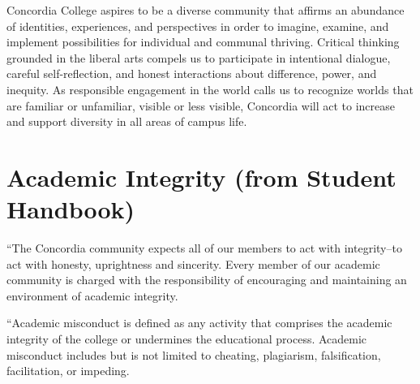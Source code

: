 \documentclass{tufte-handout}
\begin{document}
\begin{fullwidth}
 Concordia College aspires to be a diverse community that affirms an abundance of identities, experiences, and perspectives in order to imagine, examine, and implement possibilities for individual and communal thriving. Critical thinking grounded in the liberal arts compels us to participate in intentional dialogue, careful self-reflection, and honest interactions about difference, power, and inequity. As responsible engagement in the world calls us to recognize worlds that are familiar or unfamiliar, visible or less visible, Concordia will act to increase and support diversity in all areas of campus life.

\end{fullwidth}

\section{Academic Integrity (from Student Handbook)}


``The Concordia community expects all of our members to act with integrity--to act with honesty, uprightness and sincerity. Every member of our academic community is charged with the responsibility of encouraging and maintaining an environment of academic integrity.

``Academic misconduct is defined as any activity that comprises the academic integrity of the college or undermines the educational process. Academic misconduct includes but is not limited to cheating, plagiarism, falsification, facilitation, or impeding.


\end{document}
